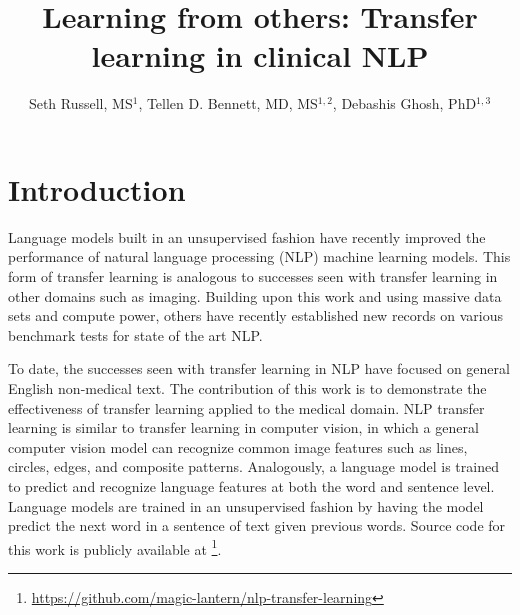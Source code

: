 \documentclass{amia}
\begin{document}
\title{Learning from others: Transfer learning in clinical NLP}

\author{Seth Russell, MS$^{1}$,
    Tellen D. Bennett, MD, MS$^{1,2}$,
    Debashis Ghosh, PhD$^{1,3}$}


\maketitle



%
% 

\section*{Introduction}

Language models built in an unsupervised fashion have recently improved the performance of natural language processing (NLP) machine learning models.\cite{howard_universal_2018} This form of transfer learning is analogous to successes seen with transfer learning in other domains such as imaging. Building upon this work and using massive data sets and compute power, others have recently established new records on various benchmark tests for state of the art NLP.\cite{radford_language_2019}

To date, the successes seen with transfer learning in NLP have focused on general English non-medical text. The contribution of this work is to demonstrate the effectiveness of transfer learning applied to the medical domain. NLP transfer learning is similar to transfer learning in computer vision, in which a general computer vision model can recognize common image features such as lines, circles, edges, and composite patterns. Analogously, a language model is trained to predict and recognize language features at both the word and sentence level. Language models are trained in an unsupervised fashion by having the model predict the next word in a sentence of text given previous words. Source code for this work is publicly available at \footnote{\url{https://github.com/magic-lantern/nlp-transfer-learning}}.
\end{document}
